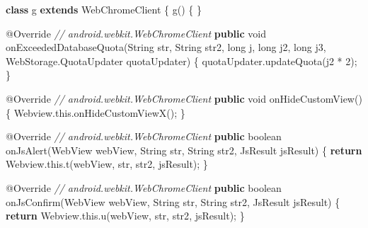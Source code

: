 \documentclass[
]{article}
\newenvironment{Shaded}{}{}
\newcommand{\AttributeTok}[1]{\textcolor[rgb]{0.49,0.56,0.16}{#1}}
\newcommand{\BuiltInTok}[1]{\textcolor[rgb]{0.00,0.50,0.00}{#1}}
\newcommand{\CommentTok}[1]{\textcolor[rgb]{0.38,0.63,0.69}{\textit{#1}}}
\newcommand{\ControlFlowTok}[1]{\textcolor[rgb]{0.00,0.44,0.13}{\textbf{#1}}}
\newcommand{\DataTypeTok}[1]{\textcolor[rgb]{0.56,0.13,0.00}{#1}}
\newcommand{\DecValTok}[1]{\textcolor[rgb]{0.25,0.63,0.44}{#1}}
\newcommand{\FunctionTok}[1]{\textcolor[rgb]{0.02,0.16,0.49}{#1}}
\newcommand{\KeywordTok}[1]{\textcolor[rgb]{0.00,0.44,0.13}{\textbf{#1}}}
\newcommand{\NormalTok}[1]{#1}
\newcommand{\OperatorTok}[1]{\textcolor[rgb]{0.40,0.40,0.40}{#1}}
\begin{document}
\begin{Shaded}
\begin{Highlighting}[]
    \KeywordTok{class}\NormalTok{ g }\KeywordTok{extends}\NormalTok{ WebChromeClient }\OperatorTok{\{}
        \FunctionTok{g}\OperatorTok{()} \OperatorTok{\{}
        \OperatorTok{\}}

        \AttributeTok{@Override} \CommentTok{// android.webkit.WebChromeClient}
        \KeywordTok{public} \DataTypeTok{void} \FunctionTok{onExceededDatabaseQuota}\OperatorTok{(}\BuiltInTok{String}\NormalTok{ str}\OperatorTok{,} \BuiltInTok{String}\NormalTok{ str2}\OperatorTok{,} \DataTypeTok{long}\NormalTok{ j}\OperatorTok{,} \DataTypeTok{long}\NormalTok{ j2}\OperatorTok{,} \DataTypeTok{long}\NormalTok{ j3}\OperatorTok{,}\NormalTok{ WebStorage}\OperatorTok{.}\FunctionTok{QuotaUpdater}\NormalTok{ quotaUpdater}\OperatorTok{)} \OperatorTok{\{}
\NormalTok{            quotaUpdater}\OperatorTok{.}\FunctionTok{updateQuota}\OperatorTok{(}\NormalTok{j2 }\OperatorTok{*} \DecValTok{2}\OperatorTok{);}
        \OperatorTok{\}}

        \AttributeTok{@Override} \CommentTok{// android.webkit.WebChromeClient}
        \KeywordTok{public} \DataTypeTok{void} \FunctionTok{onHideCustomView}\OperatorTok{()} \OperatorTok{\{}
\NormalTok{            Webview}\OperatorTok{.}\FunctionTok{this}\OperatorTok{.}\FunctionTok{onHideCustomViewX}\OperatorTok{();}
        \OperatorTok{\}}

        \AttributeTok{@Override} \CommentTok{// android.webkit.WebChromeClient}
        \KeywordTok{public} \DataTypeTok{boolean} \FunctionTok{onJsAlert}\OperatorTok{(}\NormalTok{WebView webView}\OperatorTok{,} \BuiltInTok{String}\NormalTok{ str}\OperatorTok{,} \BuiltInTok{String}\NormalTok{ str2}\OperatorTok{,}\NormalTok{ JsResult jsResult}\OperatorTok{)} \OperatorTok{\{}
            \ControlFlowTok{return}\NormalTok{ Webview}\OperatorTok{.}\FunctionTok{this}\OperatorTok{.}\FunctionTok{t}\OperatorTok{(}\NormalTok{webView}\OperatorTok{,}\NormalTok{ str}\OperatorTok{,}\NormalTok{ str2}\OperatorTok{,}\NormalTok{ jsResult}\OperatorTok{);}
        \OperatorTok{\}}

        \AttributeTok{@Override} \CommentTok{// android.webkit.WebChromeClient}
        \KeywordTok{public} \DataTypeTok{boolean} \FunctionTok{onJsConfirm}\OperatorTok{(}\NormalTok{WebView webView}\OperatorTok{,} \BuiltInTok{String}\NormalTok{ str}\OperatorTok{,} \BuiltInTok{String}\NormalTok{ str2}\OperatorTok{,}\NormalTok{ JsResult jsResult}\OperatorTok{)} \OperatorTok{\{}
            \ControlFlowTok{return}\NormalTok{ Webview}\OperatorTok{.}\FunctionTok{this}\OperatorTok{.}\FunctionTok{u}\OperatorTok{(}\NormalTok{webView}\OperatorTok{,}\NormalTok{ str}\OperatorTok{,}\NormalTok{ str2}\OperatorTok{,}\NormalTok{ jsResult}\OperatorTok{);}
        \OperatorTok{\}}


\end{Highlighting}
\end{Shaded}
\end{document}
